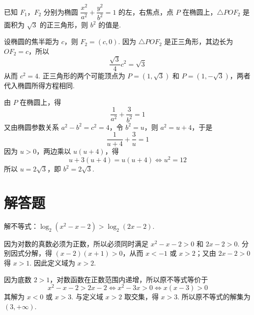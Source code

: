 \begin{problem}
已知 \(F_1\)，\(F_2\) 分别为椭圆 \(\dfrac{x^2}{a^2}+\dfrac{y^2}{b^2}=1\) 的左，右焦点，点 \(P\) 在椭圆上，\(\triangle POF_2\) 是面积为 \(\sqrt{3}\) 的正三角形，则 \(b^2\) 的值是\fillinblank{}.

\begin{solution}
设椭圆的焦半距为 \(c\)，则 \(F_2=(c,0)\). 因为 \(\triangle POF_2\) 是正三角形，其边长为 \(OF_2=c\)，所以
\[
\frac{\sqrt{3}}{4}c^2=\sqrt{3}
\]
从而 \(c^2=4\). 正三角形的两个可能顶点为 \(P=(1,\sqrt{3})\) 和 \(P=(1,-\sqrt{3})\)，两者代入椭圆所得方程相同.

由 \(P\) 在椭圆上，得
\[
\frac{1}{a^2}+\frac{3}{b^2}=1
\]
又由椭圆参数关系 \(a^2-b^2=c^2=4\)，令 \(b^2=u\)，则 \(a^2=u+4\)，于是
\[
\frac{1}{u+4}+\frac{3}{u}=1
\]
因为 \(u>0\)，两边乘以 \(u(u+4)\)，得
\[
u+3(u+4)=u(u+4)\Longleftrightarrow u^2=12
\]
所以 \(u=2\sqrt{3}\)，即 \(b^2=2\sqrt{3}\).
\end{solution}
\end{problem}

\section{解答题}
\begin{problem}
解不等式：\(\log_{2}(x^2-x-2)>\log_{2}(2x-2)\).

\begin{solution}
因为对数的真数必须为正数，所以必须同时满足 \(x^2-x-2>0\) 和 \(2x-2>0\). 分别因式分解，得 \((x-2)(x+1)>0\)，从而 \(x<-1\) 或 \(x>2\)；又由 \(2x-2>0\) 得 \(x>1\). 因此定义域为 \(x>2\).

因为底数 \(2>1\)，对数函数在正数范围内递增，所以原不等式等价于
\[
x^2-x-2>2x-2
\Longleftrightarrow x^2-3x>0
\Longleftrightarrow x(x-3)>0
\]
其解为 \(x<0\) 或 \(x>3\). 与定义域 \(x>2\) 取交集，得 \(x>3\). 所以原不等式的解集为 \((3,+\infty)\).
\end{solution}
\end{problem}

